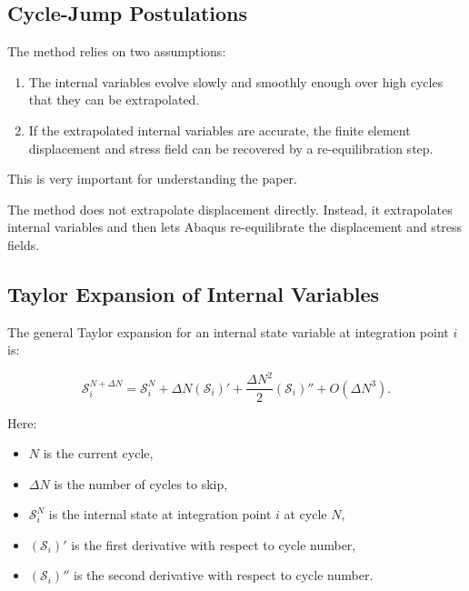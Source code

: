 \documentclass[11pt,a4paper]{article}
\begin{document}
\subsection{Cycle-Jump Postulations}

The method relies on two assumptions:

\begin{enumerate}
    \item The internal variables evolve slowly and smoothly enough over high cycles that they can be extrapolated.
    \item If the extrapolated internal variables are accurate, the finite element displacement and stress field can be recovered by a re-equilibration step.
\end{enumerate}

This is very important for understanding the paper.

The method does not extrapolate displacement directly. Instead, it extrapolates internal variables and then lets Abaqus re-equilibrate the displacement and stress fields.

\subsection{Taylor Expansion of Internal Variables}

The general Taylor expansion for an internal state variable at integration point $i$ is:

\begin{equation}
\mathcal{S}_{i}^{N+\Delta N}
=
\mathcal{S}_{i}^{N}
+
\Delta N
\left(\mathcal{S}_{i}\right)'
+
\frac{\Delta N^2}{2}
\left(\mathcal{S}_{i}\right)''
+
O(\Delta N^3).
\end{equation}

Here:

\begin{itemize}
    \item $N$ is the current cycle,
    \item $\Delta N$ is the number of cycles to skip,
    \item $\mathcal{S}_{i}^{N}$ is the internal state at integration point $i$ at cycle $N$,
    \item $(\mathcal{S}_{i})'$ is the first derivative with respect to cycle number,
    \item $(\mathcal{S}_{i})''$ is the second derivative with respect to cycle number.
\end{itemize}
\end{document}
